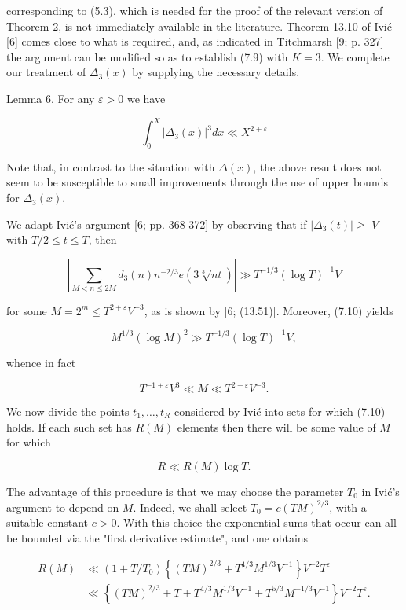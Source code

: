 \documentclass[10pt]{article}
\begin{document}
corresponding to (5.3), which is needed for the proof of the relevant version of Theorem 2, is not immediately available in the literature. Theorem 13.10 of Ivić [6] comes close to what is required, and, as indicated in Titchmarsh [9; p. 327] the argument can be modified so as to establish (7.9) with $K=3$. We complete our treatment of $\Delta_{3}(x)$ by supplying the necessary details.

Lemma 6. For any $\varepsilon>0$ we have

$$
\int_{0}^{X}\left|\Delta_{3}(x)\right|^{3} d x \ll X^{2+\varepsilon}
$$

Note that, in contrast to the situation with $\Delta(x)$, the above result does not seem to be susceptible to small improvements through the use of upper bounds for $\Delta_{3}(x)$.

We adapt Ivić's argument [6; pp. 368-372] by observing that if $\left|\Delta_{3}(t)\right| \geq$ $V$ with $T / 2 \leq t \leq T$, then


\begin{equation*}
\left|\sum_{M<n \leq 2 M} d_{3}(n) n^{-2 / 3} e(3 \sqrt[3]{n t})\right| \gg T^{-1 / 3}(\log T)^{-1} V \tag{7.10}
\end{equation*}


for some $M=2^{m} \leq T^{2+\varepsilon} V^{-3}$, as is shown by [6; (13.51)]. Moreover, (7.10) yields

$$
M^{1 / 3}(\log M)^{2} \gg T^{-1 / 3}(\log T)^{-1} V,
$$

whence in fact


\begin{equation*}
T^{-1+\varepsilon} V^{3} \ll M \ll T^{2+\varepsilon} V^{-3}. \tag{7.11}
\end{equation*}


We now divide the points $t_{1}, \ldots, t_{R}$ considered by Ivić into sets for which (7.10) holds. If each such set has $R(M)$ elements then there will be some value of $M$ for which

$$
R \ll R(M) \log T .
$$

The advantage of this procedure is that we may choose the parameter $T_{0}$ in Ivić's argument to depend on $M$. Indeed, we shall select $T_{0}=c(T M)^{2 / 3}$, with a suitable constant $c>0$. With this choice the exponential sums that occur can all be bounded via the "first derivative estimate", and one obtains

$$
\begin{aligned}
R(M) & \ll\left(1+T / T_{0}\right)\left\{(T M)^{2 / 3}+T^{4 / 3} M^{1 / 3} V^{-1}\right\} V^{-2} T^{\varepsilon} \\
& \ll\left\{(T M)^{2 / 3}+T+T^{4 / 3} M^{1 / 3} V^{-1}+T^{5 / 3} M^{-1 / 3} V^{-1}\right\} V^{-2} T^{\varepsilon} .
\end{aligned}
$$
\end{document}
